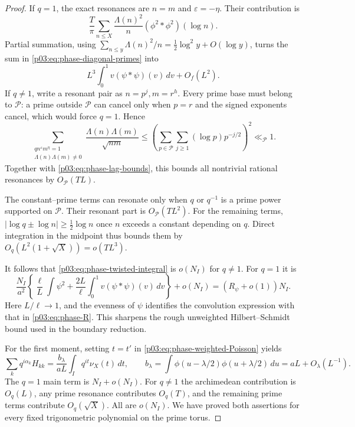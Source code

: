 \documentclass[11pt,letterpaper]{article}
\theoremstyle{definition}
\theoremstyle{remark}
\newcommand{\1}{\mathbf 1}
\begin{document}
\begin{proof}
If $q=1$, the exact resonances are $n=m$ and
$\varepsilon=-\eta$. Their contribution is
\begin{equation}\label{p03:eq:phase-diagonal-primes}
 \frac T\pi\sum_{n\le X}\frac{\Lambda(n)^2}{n}
                  (\phi^2*\phi^2)(\log n).
\end{equation}
Partial summation, using
$\sum_{n\le y}\Lambda(n)^2/n=\tfrac12\log^2y+O(\log y)$,
turns the sum in \eqref{p03:eq:phase-diagonal-primes} into
\[
 L^3\int_0^1v(\psi*\psi)(v)\,dv+O_f(L^2).
\]
If $q\ne1$, write a resonant pair as $n=p^j,m=r^h$. Every prime
base must belong to $\mathcal P$: a prime outside $\mathcal P$
can cancel only when $p=r$ and the signed exponents cancel,
which would force $q=1$. Hence
\begin{equation}\label{p03:eq:phase-sparse-resonance}
 \sum_{\substack{q n^\varepsilon m^\eta=1\\
                  \Lambda(n)\Lambda(m)\ne0}}
       \frac{\Lambda(n)\Lambda(m)}{\sqrt{nm}}
 \le\left(\sum_{p\in\mathcal P}\sum_{j\ge1}
                 (\log p)p^{-j/2}\right)^2\ll_{\mathcal P}1.
\end{equation}
Together with \eqref{p03:eq:phase-lag-bounds}, this bounds all nontrivial
rational resonances by $O_{\mathcal P}(TL)$.

The constant--prime terms can resonate only when $q$ or $q^{-1}$
is a prime power supported on $\mathcal P$. Their resonant part is
$O_{\mathcal P}(TL^2)$. For the remaining terms,
$|\log q\pm\log n|\ge\frac12\log n$ once $n$ exceeds a constant
depending on $q$. Direct integration in the midpoint thus bounds
them by $O_q(L^2(1+\sqrt X))=o(TL^3)$.

It follows that \eqref{p03:eq:phase-twisted-integral} is $o(N_I)$ for
$q\ne1$. For $q=1$ it is
\[
 \frac{N_I}{a^2}\left\{
   \frac\ell L\int\psi^2+
   \frac{2L}\ell\int_0^1v(\psi*\psi)(v)\,dv\right\}+o(N_I)
       =(R_\psi+o(1))N_I.
\]
Here $L/\ell\to1$, and the evenness of $\psi$ identifies the
convolution expression with that in \eqref{p03:eq:phase-R}. This sharpens the rough unweighted Hilbert--Schmidt bound used
in the boundary reduction.

For the first moment, setting $t=t'$ in
\eqref{p03:eq:phase-weighted-Poisson} yields
\[
 \sum_kq^{i\alpha_k}H_{kk}
  =\frac{b_\lambda}{aL}\int_Iq^{it}\nu_X(t)\,dt,
 \qquad
 b_\lambda=\int\phi(u-\lambda/2)\phi(u+\lambda/2)\,du
              =aL+O_\lambda(L^{-1}).
\]
The $q=1$ main term is $N_I+o(N_I)$. For $q\ne1$ the
archimedean contribution is $O_q(L)$, any prime resonance contributes
$O_q(T)$, and the remaining prime terms contribute $O_q(\sqrt X)$.
All are $o(N_I)$. We have proved both assertions for every fixed
trigonometric polynomial on the prime torus.


\end{proof}
\end{document}
